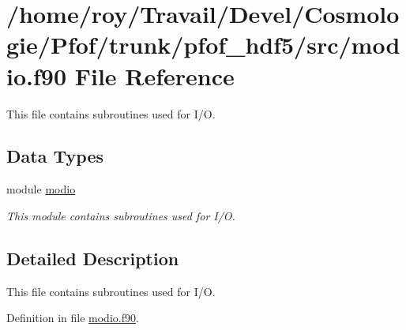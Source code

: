 \hypertarget{pfof__hdf5_2src_2modio_8f90}{\section{/home/roy/\-Travail/\-Devel/\-Cosmologie/\-Pfof/trunk/pfof\-\_\-hdf5/src/modio.f90 File Reference}
\label{pfof__hdf5_2src_2modio_8f90}
}


This file contains subroutines used for I/\-O.  


\subsection*{Data Types}
\begin{DoxyCompactItemize}
\item 
module \hyperlink{classmodio}{modio}
\begin{DoxyCompactList}\small\item\em This module contains subroutines used for I/\-O. \end{DoxyCompactList}\end{DoxyCompactItemize}


\subsection{Detailed Description}
This file contains subroutines used for I/\-O. 

Definition in file \hyperlink{pfof__hdf5_2src_2modio_8f90_source}{modio.\-f90}.

